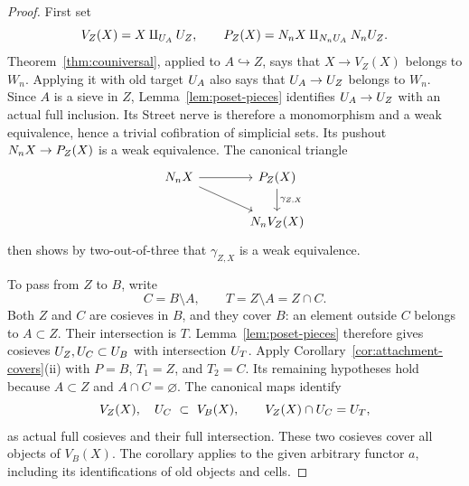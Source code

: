 \begin{proof}
First set
\[
 V_Z(X)=X\amalg_{U_{A}}U_{Z},\qquad
 P_Z(X)=N_n X\amalg_{N_nU_{A}}N_nU_{Z}.
\]
Theorem~\ref{thm:couniversal}, applied to $A\hookrightarrow Z$, says
that $X\to V_Z(X)$ belongs to $W_n$.  Applying it with old target
$U_{A}$ also says that $U_{A}\to U_{Z}$ belongs to $W_n$.
Since $A$ is a sieve in $Z$, Lemma~\ref{lem:poset-pieces} identifies
$U_{A}\to U_{Z}$ with an actual full inclusion.  Its Street nerve is
therefore a monomorphism and a weak equivalence, hence a trivial
cofibration of simplicial sets.  Its pushout
$N_n X\to P_Z(X)$ is a weak equivalence.  The canonical triangle
\[
 \begin{tikzcd}[column sep=large]
 \Street X \arrow[r] \arrow[dr] & P_Z(X) \arrow[d,"\gamma_{Z,X}"]\\
 & \Street V_Z(X)
 \end{tikzcd}
\]
then shows by two-out-of-three that $\gamma_{Z,X}$ is a weak
equivalence.

To pass from $Z$ to $B$, write
\[
 C=B\setminus A,\qquad T=Z\setminus A=Z\cap C.
\]
Both $Z$ and $C$ are cosieves in $B$, and they cover $B$: an element
outside $C$ belongs to $A\subset Z$.  Their intersection is $T$.
Lemma~\ref{lem:poset-pieces} therefore gives cosieves
$U_{Z},U_{C}\subset U_{B}$ with intersection $U_{T}$.
Apply Corollary~\ref{cor:attachment-covers}(ii) with $P=B$,
$T_1=Z$, and $T_2=C$.  Its remaining hypotheses hold because
$A\subset Z$ and $A\cap C=\varnothing$.  The canonical maps identify
\begin{equation}
 V_Z(X),\quad U_{C}\ \subset\ V_B(X),
 \qquad V_Z(X)\cap U_{C}=U_{T},
 \label{eq:attachment-fibers}
\end{equation}
as actual full cosieves and their full intersection.  These two
cosieves cover all objects of $V_B(X)$.  The corollary applies to the
given arbitrary functor $a$, including its identifications of old
objects and cells.


\end{proof}
